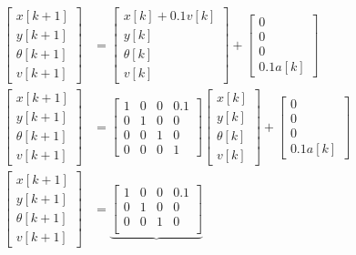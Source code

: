 \documentclass[]{article}
\begin{document}
\begin{align}
	\begin{bmatrix}
	x[k + 1] \\
	y[k + 1] \\
	\theta[k + 1] \\
	v[k + 1]
	\end{bmatrix}
	&=
	\begin{bmatrix}
	x[k] + 0.1v[k] \\
	y[k] \\
	\theta[k] \\
	v[k]
	\end{bmatrix}
	+
	\begin{bmatrix}
	0 \\
	0 \\
	0 \\
	0.1 a[k]
	\end{bmatrix} \\
	\begin{bmatrix}
	x[k + 1] \\
	y[k + 1] \\
	\theta[k + 1] \\
	v[k + 1]
	\end{bmatrix}
	&=
	\begin{bmatrix}
	1 & 0 & 0 & 0.1 \\
	0 & 1 & 0 & 0 \\
	0 & 0 & 1 & 0 \\
	0 & 0 & 0 & 1
	\end{bmatrix}
	\begin{bmatrix}
	x[k]\\
	y[k] \\
	\theta[k] \\
	v[k]
	\end{bmatrix}
	+
	\begin{bmatrix}
	0 \\
	0 \\
	0 \\
	0.1 a[k]
	\end{bmatrix} \\
	\begin{bmatrix}
	x[k + 1] \\
	y[k + 1] \\
	\theta[k + 1] \\
	v[k + 1]
	\end{bmatrix}
	&=
	\underbrace{
	\begin{bmatrix}
	1 & 0 & 0 & 0.1 \\
	0 & 1 & 0 & 0 \\
	0 & 0 & 1 & 0 \\

\end{bmatrix}}
\end{align}
\end{document}
